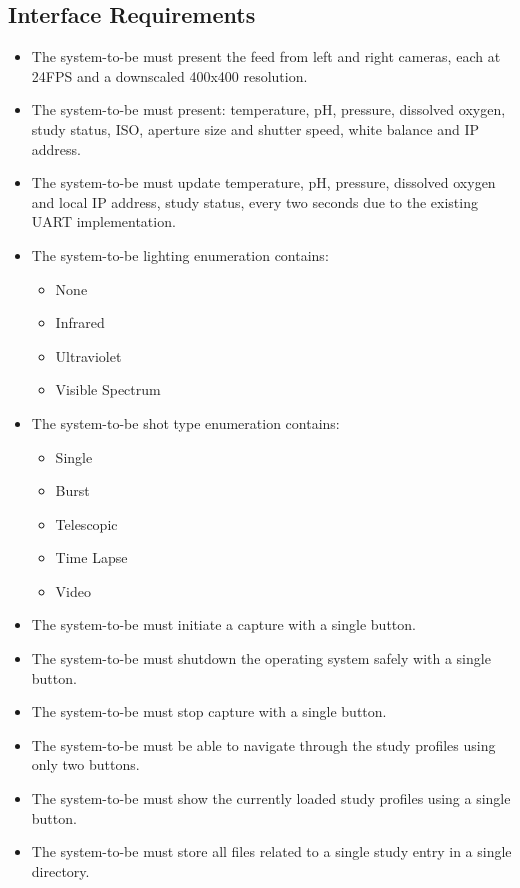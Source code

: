 \subsection{Interface Requirements}
\begin{itemize}
	\item The system-to-be must present the feed from left and right cameras, each at 24FPS and a downscaled 400x400 resolution.
	\item The system-to-be must present: temperature, pH, pressure, dissolved oxygen, study status, ISO, aperture size and shutter speed, white balance and IP address.
	\item The system-to-be must update temperature, pH, pressure, dissolved oxygen and local IP address, study status, every two seconds due to the existing UART implementation.
	\item The system-to-be lighting enumeration contains:
	      \begin{itemize}
		      \item None
		      \item Infrared
		      \item Ultraviolet
		      \item Visible Spectrum
	      \end{itemize}
	\item The system-to-be shot type enumeration contains:
	      \begin{itemize}
		      \item Single
		      \item Burst
		      \item Telescopic
		      \item Time Lapse
		      \item Video
	      \end{itemize}
	\item The system-to-be must initiate a capture with a single button.
	\item The system-to-be must shutdown the operating system safely with a single button.
	\item The system-to-be must stop capture with a single button.
	\item The system-to-be must be able to navigate through the study profiles using only two buttons.
	\item The system-to-be must show the currently loaded study profiles using a single button.
	\item The system-to-be must store all files related to a single study entry in a single directory.

\end{itemize}
